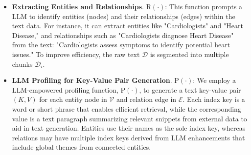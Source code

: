 \documentclass{article} %
\begin{document}
\begin{itemize}[leftmargin=*]


    \item \textbf{Extracting Entities and Relationships}. $\text{R}(\cdot)$: This function prompts a LLM to identify entities (nodes) and their relationships (edges) within the text data. For instance, it can extract entities like "Cardiologists" and "Heart Disease," and relationships such as "Cardiologists diagnose Heart Disease" from the text: "Cardiologists assess symptoms to identify potential heart issues." To improve efficiency, the raw text $\mathcal{D}$ is segmented into multiple chunks $\mathcal{D}_i$.
    

    \item \textbf{LLM Profiling for Key-Value Pair Generation}. $\text{P}(\cdot)$: We employ a LLM-empowered profiling function, $\text{P}(\cdot)$, to generate a text key-value pair $(K, V)$ for each entity node in $\mathcal{V}$ and relation edge in $\mathcal{E}$. Each index key is a word or short phrase that enables efficient retrieval, while the corresponding value is a text paragraph summarizing relevant snippets from external data to aid in text generation. Entities use their names as the sole index key, whereas relations may have multiple index keys derived from LLM enhancements that include global themes from connected entities.
    

\end{itemize}
\end{document}
